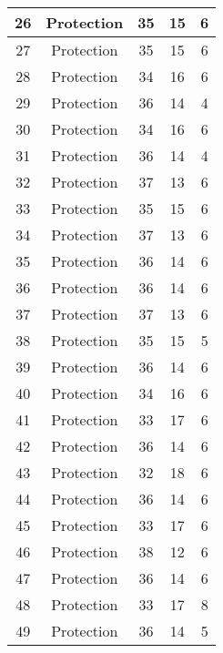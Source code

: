 \documentclass[results.tex]{subfiles}
\begin{document}
\begin{center}
\begin{tabular}{| c || c | c | c | c |}
    \hline
    26 & Protection & 35 & 15 & 6 \\ 
    \hline
    27 & Protection & 35 & 15 & 6 \\ 
    \hline
    28 & Protection & 34 & 16 & 6 \\ 
    \hline
    29 & Protection & 36 & 14 & 4 \\ 
    \hline
    30 & Protection & 34 & 16 & 6 \\ 
    \hline
    31 & Protection & 36 & 14 & 4 \\ 
    \hline
    32 & Protection & 37 & 13 & 6 \\ 
    \hline
    33 & Protection & 35 & 15 & 6 \\ 
    \hline
    34 & Protection & 37 & 13 & 6 \\ 
    \hline
    35 & Protection & 36 & 14 & 6 \\ 
    \hline
    36 & Protection & 36 & 14 & 6 \\ 
    \hline
    37 & Protection & 37 & 13 & 6 \\ 
    \hline
    38 & Protection & 35 & 15 & 5 \\ 
    \hline
    39 & Protection & 36 & 14 & 6 \\ 
    \hline
    40 & Protection & 34 & 16 & 6 \\ 
    \hline
    41 & Protection & 33 & 17 & 6 \\ 
    \hline
    42 & Protection & 36 & 14 & 6 \\ 
    \hline
    43 & Protection & 32 & 18 & 6 \\ 
    \hline
    44 & Protection & 36 & 14 & 6 \\ 
    \hline
    45 & Protection & 33 & 17 & 6 \\ 
    \hline
    46 & Protection & 38 & 12 & 6 \\ 
    \hline
    47 & Protection & 36 & 14 & 6 \\ 
    \hline
    48 & Protection & 33 & 17 & 8 \\ 
    \hline
    49 & Protection & 36 & 14 & 5 \\ 
    \hline   \end{tabular}
\end{center}
\end{document}
